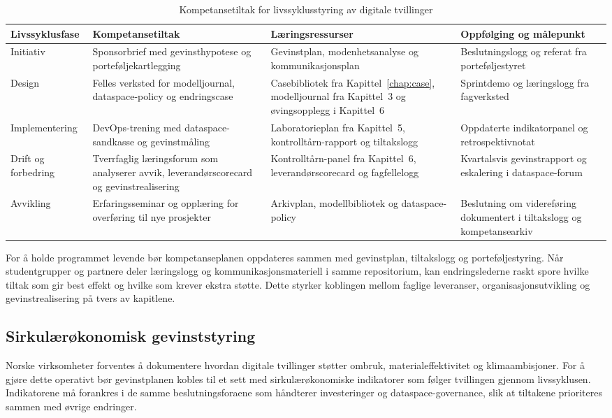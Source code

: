 \begin{table}[h]
    \centering
    \caption{Kompetansetiltak for livssyklusstyring av digitale tvillinger}
    \label{tab:kompetanse-livssyklus}
    \begin{tabular}{p{2.7cm}p{3.8cm}p{3.4cm}p{3.2cm}}
        \toprule
        Livssyklusfase & Kompetansetiltak & Læringsressurser & Oppfølging og målepunkt \\
        \midrule
        Initiativ & Sponsorbrief med gevinsthypotese og porteføljekartlegging & Gevinstplan, modenhetsanalyse og kommunikasjonsplan & Beslutningslogg og referat fra porteføljestyret \citep{dfo2023endringsledelse} \\
        Design & Felles verksted for modelljournal, dataspace-policy og endringscase & Casebibliotek fra Kapittel~\ref{chap:case}, modelljournal fra Kapittel~3 og øvingsopplegg i Kapittel~6 & Sprintdemo og læringslogg fra fagverksted \citep{ks2024kompetanseprogram} \\
        Implementering & DevOps-trening med dataspace-sandkasse og gevinstmåling & Laboratorieplan fra Kapittel~5, kontrolltårn-rapport og tiltakslogg & Oppdaterte indikatorpanel og retrospektivnotat \citep{digdir2022gevinst} \\
        Drift og forbedring & Tverrfaglig læringsforum som analyserer avvik, leverandørscorecard og gevinstrealisering & Kontrolltårn-panel fra Kapittel~6, leverandørscorecard og fagfellelogg & Kvartalsvis gevinstrapport og eskalering i dataspace-forum \citep{dfo2023endringsledelse,digdir2022gevinst} \\
        Avvikling & Erfaringsseminar og opplæring for overføring til nye prosjekter & Arkivplan, modellbibliotek og dataspace-policy & Beslutning om videreføring dokumentert i tiltakslogg og kompetansearkiv \citep{dfo2023endringsledelse} \\
        \bottomrule
    \end{tabular}
\end{table}

For å holde programmet levende bør kompetanseplanen oppdateres sammen med gevinstplan, tiltakslogg og porteføljestyring. Når studentgrupper og partnere deler læringslogg og kommunikasjonsmateriell i samme repositorium, kan endringslederne raskt spore hvilke tiltak som gir best effekt og hvilke som krever ekstra støtte. Dette styrker koblingen mellom faglige leveranser, organisasjonsutvikling og gevinstrealisering på tvers av kapitlene.

\subsection*{Sirkulærøkonomisk gevinststyring}
Norske virksomheter forventes å dokumentere hvordan digitale tvillinger støtter ombruk, materialeffektivitet og klimaambisjoner.\citep{norskindustri2023sirkular,regjeringen2021sirkulaer} For å gjøre dette operativt bør gevinstplanen kobles til et sett med sirkulærøkonomiske indikatorer som følger tvillingen gjennom livssyklusen. Indikatorene må forankres i de samme beslutningsforaene som håndterer investeringer og dataspace-governance, slik at tiltakene prioriteres sammen med øvrige endringer.

